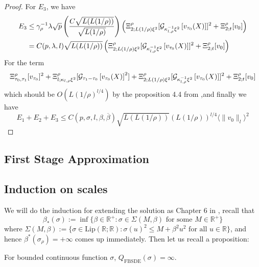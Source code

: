 \begin{proof}
    For $E_3$, we have
    \[
    \begin{aligned}
        E_3 &\leq \gamma_{\rho}^{-1}\lambda\sqrt{p}\left(\dfrac{C\sqrt{L(L(1/\rho))}}{\sqrt{L(1/\rho)}}\right)\left(\Xi^{\rho}_{2;L(1/\rho)\xi^2}[\mathcal{G}_{\kappa_{l,\rho}^{-1}\xi^2}\left[{v_{\tau_0}(X)}\right]]^2+\Xi^{\rho}_{2;t}[v_0]\right) \\
        &= C(p,\lambda,l)\sqrt{L(L(1/\rho))}\left(\Xi^{\rho}_{2;L(1/\rho)\xi^2}[\mathcal{G}_{\kappa_{l,\rho}^{-1}\xi^2}\left[{v_{\tau_0}(X)}\right]]^2+\Xi^{\rho}_{2;t}[v_0]\right)
    \end{aligned}
    \]
    For the term
    \[
    \Xi^{\rho}_{\tau_0,\tau_1}[v_{\tau_0}]^2 +  \Xi_{l;\kappa_{l,\rho}\xi^2}^{\rho}[\mathcal{G}_{\tau_1-\tau_0}\left[{v_{\tau_0}(X)}\right]^2] + \Xi^{\rho}_{2;L(1/\rho)\xi^2}[\mathcal{G}_{\kappa_{l,\rho}^{-1}\xi^2}\left[{v_{\tau_0}(X)}\right]]^2+\Xi^{\rho}_{2;t}[v_0]
    \]
    which should be $O(L(1/\rho)^{l/4})$ by the proposition 4.4 from \cite{dunlap2026renormalizationflow2dnonlinear},and finally we have
    \[
    E_1 + E_2 + E_3 \leq C(p,\sigma,l,\beta,\overline{\beta})\sqrt{L(L(1/\rho))}(L(1/\rho))^{l/4}\langle \lVert v_0\rVert_l\rangle^2
    \]
    \end{proof}

\subsection{First Stage Approximation}

\begin{theorem} 

    
\end{theorem}


\subsection{Induction on scales}

We will do the induction for extending the solution as Chapter 6 in \cite{dunlap2026renormalizationflow2dnonlinear}, recall that
\[
\beta_*(\sigma):= \inf\{\beta \in\mathbb{R}^+:\sigma \in \Sigma(M,\beta)\text{ for some }M\in\mathbb{R}^+\}
\]
where $\Sigma(M,\beta):=\{\sigma\in \text{Lip}(\mathbb{R};\mathbb{R}):\sigma(u)^2 \leq M + \beta^2 u^2\text{ for all }u\in\mathbb{R}\}$, and hence $\beta^*(\sigma_{\rho}) = +\infty$ comes up immediately. Then let us recall a proposition:

\begin{proposition}
    For bounded continuous function $\sigma$, $Q_{\text{FBSDE}}(\sigma) = \infty$.
\end{proposition}

